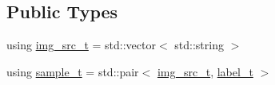 \subsection*{Public Types}
\begin{DoxyCompactItemize}
\item 
using \hyperlink{classlbann_1_1data__reader__multi__images_ac817914ad82e09471f13fce5b0b5faef}{img\+\_\+src\+\_\+t} = std\+::vector$<$ std\+::string $>$
\item 
using \hyperlink{classlbann_1_1data__reader__multi__images_a6cbb30001dd633b0d810c417cbbf441e}{sample\+\_\+t} = std\+::pair$<$ \hyperlink{classlbann_1_1image__data__reader_acd2b41459e901a3aed39fd3be7270fa2}{img\+\_\+src\+\_\+t}, \hyperlink{classlbann_1_1image__data__reader_a7645f17852c990e80b1530509ff5e87c}{label\+\_\+t} $>$
\end{DoxyCompactItemize}
